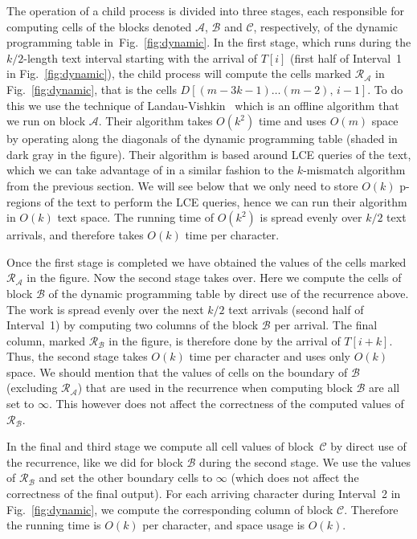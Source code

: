 \documentclass[envcountsame]{llncs}
\newcommand{\calA}{\ensuremath{\mathcal{A}}}
\newcommand{\calB}{\ensuremath{\mathcal{B}}}
\newcommand{\calC}{\ensuremath{\mathcal{C}}}
\newcommand{\calR}{\ensuremath{\mathcal{R}}}
\newcommand{\upto}{\ensuremath{\ldots}}
\newcommand{\pregions}{\mbox{p-regions}\xspace}
\begin{document}
The operation of a child process is divided into three stages, each responsible for computing cells of the blocks denoted $\calA$, $\calB$ and $\calC$, respectively, of the dynamic programming table in~Fig.~\ref{fig:dynamic}. In the first stage, which runs during the $k/2$-length text interval starting with the arrival of $T[i]$ (first half of Interval~1 in Fig.~\ref{fig:dynamic}), the child process will compute the cells marked $\calR_\calA$ in Fig.~\ref{fig:dynamic}, that is the cells $D[(m-3k-1)\upto (m-2),\,i-1]$. To do this we use the technique of Landau-Vishkin~\cite{LV:1988} which is an offline algorithm that we run on block $\calA$. Their algorithm takes $O(k^2)$ time and uses $O(m)$ space by operating along the diagonals of the dynamic programming table (shaded in dark gray in the figure). Their algorithm is based around LCE queries of the text, which we can take advantage of in a similar fashion to the $k$-mismatch algorithm from the previous section. We will see below that we only need to store $O(k)$ \pregions of the text to perform the LCE queries, hence we can run their algorithm in $O(k)$ text space. The running time of $O(k^2)$ is spread evenly over $k/2$ text arrivals, and therefore takes $O(k)$ time per character.

Once the first stage is completed we have obtained the values of the cells marked $\calR_\calA$ in the figure. Now the second stage takes over. Here we compute the cells of block $\calB$ of the dynamic programming table by direct use of the recurrence above. The work is spread evenly over the next $k/2$ text arrivals (second half of Interval~1) by computing two columns of the block $\calB$ per arrival. The final column, marked $\calR_\calB$ in the figure, is therefore done by the arrival of $T[i+k]$. Thus, the second stage takes $O(k)$ time per character and uses only $O(k)$ space. We should mention that the values of cells on the boundary of $\calB$ (excluding $\calR_\calA$) that are used in the recurrence when computing block $\calB$ are all set to $\infty$. This however does not affect the correctness of the computed values of $\calR_\calB$.

In the final and third stage we compute all cell values of block~$\calC$ by direct use of the recurrence, like we did for block $\calB$ during the second stage. We use the values of $\calR_\calB$ and set the other boundary cells to $\infty$ (which does not affect the correctness of the final output). For each arriving character during Interval~2 in Fig.~\ref{fig:dynamic}, we compute the corresponding column of  block $\calC$. Therefore the running time is $O(k)$ per character, and space usage is $O(k)$.
\end{document}
